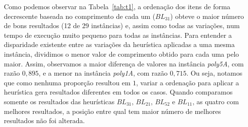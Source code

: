Como podemos observar na Tabela~\ref{tab:t1}, a ordenação dos itens de forma decrescente baseada no comprimento de cada um ($BL_{31}$) obteve o maior número de bons resultados (12 de 29 instâncias) e, assim como todas as variações, num tempo de execução muito pequeno para todas as instâncias. 
Para entender a disparidade existente entre as variações da heurística aplicadas a uma mesma instância, dividimos o menor valor de comprimento obtido para cada uma pelo maior. 
Assim, observamos a maior diferença de valores na instância \textit{poly5A}, com razão $0,895$, e a menor na instância \textit{poly1A}, com razão $0,715$. Ou seja, notamos que como nenhuma proporção resultou em $1$, variar a ordenação para aplicar a heurística gera resultados diferentes em todos os casos. 
Quando comparamos somente os resultados das heurísticas $BL_{31}$, $BL_{21}$, $BL_{52}$ e $BL_{11}$, as quatro com melhores resultados, a posição entre qual tem maior número de melhores resultados não foi alterada.





